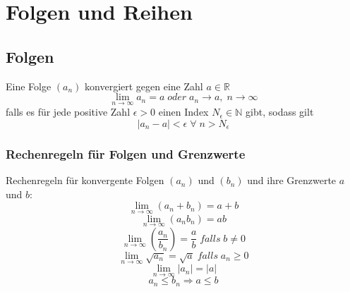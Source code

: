 \documentclass[a4paper,twocolumn,10pt]{article}
\begin{document}
\section{Folgen und Reihen}

\subsection{Folgen}
Eine Folge $(a_n)$ konvergiert gegen eine Zahl $a\in\mathbb{R}$
\begin{equation*}
\lim\limits_{n\rightarrow\infty}a_n=a\;oder\;a_n\rightarrow a,\;n\rightarrow\infty
\end{equation*}
falls es für jede positive Zahl $\epsilon>0$ einen Index $N_{\epsilon}\in \mathbb{N}$ gibt, sodass gilt
\begin{equation*}
|a_n-a|<\epsilon\;\forall\;n>N_{\epsilon}
\end{equation*}

\subsubsection{Rechenregeln für Folgen und Grenzwerte}
Rechenregeln für konvergente Folgen $(a_n)$ und $(b_n)$ und ihre Grenzwerte $a$ und $b$:
\begin{equation*}
\lim\limits_{n\rightarrow\infty}(a_n+b_n)=a+b
\end{equation*}
\begin{equation*}
\lim\limits_{n\rightarrow\infty}(a_nb_n)=ab
\end{equation*}
\begin{equation*}
\lim\limits_{n\rightarrow\infty}(\frac{a_n}{b_n})=\frac{a}{b}\;falls\;b\neq 0
\end{equation*}
\begin{equation*}
\lim\limits_{n\rightarrow\infty}\sqrt{a_n}=\sqrt{a}\;falls\; a_n\geq 0
\end{equation*}
\begin{equation*}
\lim\limits_{n\rightarrow\infty}|a_n|=|a|
\end{equation*}
\begin{equation*}
a_n\leq b_n\Rightarrow a\leq b
\end{equation*}
\end{document}

